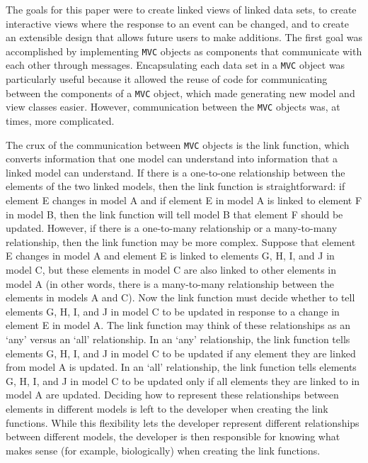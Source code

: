 \documentclass{article}[11pt]
\newcommand{\Robject}[1]{{\texttt{#1}}}
\begin{document}
The goals for this paper were to create linked views of linked data sets, to
create interactive views where the response to an event can be changed, and to
create an extensible design that allows future users to make additions.
The first goal was accomplished by implementing \Robject{MVC} objects as
components that communicate with each other through messages.  Encapsulating
each data set in a \Robject{MVC} object was particularly useful because it
allowed the reuse of code for communicating between the components of a
\Robject{MVC} object, which made generating new model and view classes easier.
However, communication between the \Robject{MVC} objects was, at times, more
complicated. 

The crux of the communication between \Robject{MVC} objects is the link
function, which converts information that one model can understand into
information that a linked model can understand.  If there is a one-to-one
relationship between the elements of the two linked models, then the link
function is straightforward:  if element E changes in model A and if element E
in model A is linked to element F in model B, then the link function will
tell model B that element F should be updated.  However, if there is a
one-to-many relationship or a many-to-many relationship, then the link
function may be more complex.  Suppose that element E changes in model A and
element E is linked to elements G, H, I, and J in model C, but these elements
in model C are also linked to other elements in model A (in other words, there
is a many-to-many relationship between the elements in models A and C).  Now
the link function must decide whether to tell elements G, H, I, and J in model
C to be updated in response to a change in element E in model A.  The link
function may think of these relationships as an `any' versus an `all'
relationship.  In an `any' relationship, the link function tells elements G,
H, I, and J in model C to be updated if any element they are linked from model
A is updated.  In an `all' relationship, the link function tells elements G,
H, I, and J in model C to be updated only if all elements they are linked to
in model A are updated.  Deciding how to represent these relationships between
elements in different models is left to the developer when creating the link
functions.  While this flexibility lets the developer represent different
relationships between different models, the developer is then responsible for
knowing what makes sense (for example, biologically) when creating the link
functions. 
\end{document}
